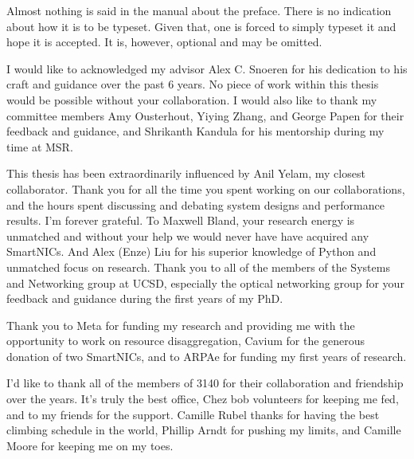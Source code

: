 \documentclass[12pt]{ucsddissertation}
\begin{document}
\tableofcontents
\listoffigures
\listoftables

\begin{preface}
Almost nothing is said in the manual about the preface. There is no
indication about how it is to be typeset. Given that, one is forced to
simply typeset it and hope it is accepted. It is, however, optional
and may be omitted.
\end{preface}

\begin{acknowledgements}

I would like to acknowledged my advisor Alex C. Snoeren for his dedication to his craft and guidance
over the past 6 years. No piece of work within this thesis would be possible without your
collaboration. I would also like to thank my committee members Amy Ousterhout, Yiying Zhang, and
George Papen for their feedback and guidance, and Shrikanth Kandula for his mentorship during my
time at MSR.

This thesis has been extraordinarily influenced by Anil Yelam, my closest collaborator. Thank you
for all the time you spent working on our collaborations, and the hours spent discussing and
debating system designs and performance results. I'm forever grateful. To Maxwell Bland, your
research energy is unmatched and without your help we would never have have acquired any SmartNICs.
And Alex (Enze) Liu for his superior knowledge of Python and unmatched focus on research.  Thank you
to all of the members of the Systems and Networking group at UCSD, especially the optical networking
group for your feedback and guidance during the first years of my PhD.

Thank you to Meta for funding my research and providing me with the opportunity to work on resource
disaggregation, Cavium for the generous donation of two SmartNICs, and to ARPAe for funding my first
years of research.

I'd like to thank all of the members of 3140 for their collaboration and friendship over the years.
It's truly the best office, Chez bob volunteers for keeping me fed, and to my friends for the
support. Camille Rubel thanks for having the best climbing schedule in the world, Phillip Arndt for
pushing my limits, and Camille Moore for keeping me on my toes.


\end{acknowledgements}
\end{document}
